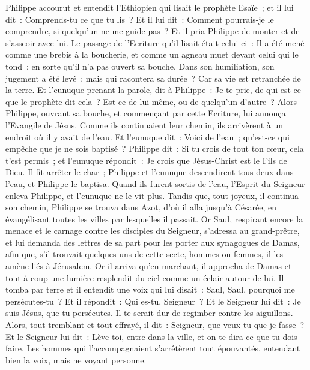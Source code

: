 \begin{multicols}{2}
Philippe accourut et entendit l'Ethiopien qui lisait le prophète Esaïe~; et il lui dit~: Comprends-tu ce que tu lis~?
Et il lui dit~: Comment pourrais-je le comprendre, si quelqu'un ne me guide pas~? Et il pria Philippe de monter et de s'asseoir avec lui.
Le passage de l'Ecriture qu'il lisait était celui-ci~: Il a été mené comme une brebis à la boucherie, et comme un agneau muet devant celui qui le tond~; en sorte qu'il n'a pas ouvert sa bouche.
Dans son humiliation, son jugement a été levé~; mais qui racontera sa durée~? Car sa vie est retranchée de la terre.
Et l'eunuque prenant la parole, dit à Philippe~: Je te prie, de qui est-ce que le prophète dit cela~? Est-ce de lui-même, ou de quelqu'un d'autre~?
Alors Philippe, ouvrant sa bouche, et commençant par cette Ecriture, lui annonça l'Evangile de Jésus.
Comme ils continuaient leur chemin, ils arrivèrent à un endroit où il y avait de l'eau. Et l'eunuque dit~: Voici de l'eau~; qu'est-ce qui empêche que je ne sois baptisé~?
Philippe dit~: Si tu crois de tout ton cœur, cela t'est permis~; et l'eunuque répondit~: Je crois que Jésus-Christ est le Fils de Dieu.
Il fit arrêter le char~; Philippe et l'eunuque descendirent tous deux dans l'eau, et Philippe le baptisa.
Quand ils furent sortis de l'eau, l'Esprit du Seigneur enleva Philippe, et l'eunuque ne le vit plus. Tandis que, tout joyeux, il continua son chemin,
Philippe se trouva dans Azot, d'où il alla jusqu'à Césarée, en évangélisant toutes les villes par lesquelles il passait.
\VerseOne{}Or Saul, respirant encore la menace et le carnage contre les disciples du Seigneur, s'adressa au grand-prêtre,
et lui demanda des lettres de sa part pour les porter aux synagogues de Damas, afin que, s'il trouvait quelques-uns de cette secte, hommes ou femmes, il les amène liés à Jérusalem.
Or il arriva qu'en marchant, il approcha de Damas et tout à coup une lumière resplendit du ciel comme un éclair autour de lui.
Il tomba par terre et il entendit une voix qui lui disait~: Saul, Saul, pourquoi me persécutes-tu~?
Et il répondit~: Qui es-tu, Seigneur~? Et le Seigneur lui dit~: Je suis Jésus, que tu persécutes. Il te serait dur de regimber contre les aiguillons.
Alors, tout tremblant et tout effrayé, il dit~: Seigneur, que veux-tu que je fasse~? Et le Seigneur lui dit~: Lève-toi, entre dans la ville, et on te dira ce que tu dois faire.
Les hommes qui l'accompagnaient s'arrêtèrent tout épouvantés, entendant bien la voix, mais ne voyant personne.

\end{multicols}
